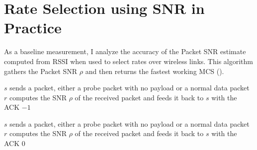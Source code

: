 \section{Rate Selection using SNR in Practice}
As a baseline measurement, I analyze the accuracy of the Packet SNR estimate computed from RSSI when used to select rates over wireless links. This algorithm gathers the Packet SNR $\rho$ and then returns the fastest working MCS ().

\begin{algorithm}[t]
\caption{\label{alg:rate_select_snr}}
\begin{algorithmic}
\STATE $s$ sends a packet, either a probe packet with no payload or a normal data packet
\STATE $r$ computes the SNR $\rho$ of the received packet and feeds it back to $s$ with the ACK
\RETURN $-1$ \hfill {}
\ELSE
{} \hfill {}
\ENDIF
\end{algorithmic}
\end{algorithm}

\begin{algorithm}[t]
\caption{\label{alg:get_bitrate_threshold}}
\begin{algorithmic}
\IF{$\rho > \tau$}
 \hfill {}
\ELSE
{} \hfill {}
\ENDIF
\end{algorithmic}
\end{algorithm}

\begin{algorithm}[t]
\caption{\label{alg:predict_rate_snr}}
\begin{algorithmic}
\STATE $s$ sends a packet, either a probe packet with no payload or a normal data packet
\STATE $r$ computes the SNR $\rho$ of the received packet and feeds it back to $s$ with the ACK
\RETURN {}
\ELSE
\RETURN $0$ \hfill {}
\ENDIF
\end{algorithmic}
\end{algorithm}

